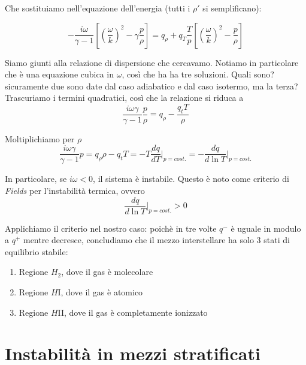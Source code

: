 \documentclass{report}
\begin{document}
Che sostituiamo nell'equazione dell'energia (tutti i $\rho'$ si semplificano): 
\begin{tcolorbox}[colback=myg!15, colframe=black, boxrule=1pt]
\begin{equation}
   -\frac{i\omega}{\gamma -1}\left[\left(\frac{\omega}{k}\right)^2 - \gamma \frac{p}{\rho}\right] = q_\rho + q_T \frac{T}{p}\left[\left(\frac{\omega}{k} \right)^2 - \frac{p}{\rho}\right]
\end{equation}
\end{tcolorbox}

Siamo giunti alla relazione di dispersione che cercavamo. Notiamo in particolare che è una equazione cubica in $\omega$, così che ha ha tre soluzioni. Quali sono? sicuramente due sono date dal caso adiabatico e dal caso isotermo, ma la terza? \\

Trascuriamo i termini quadratici, così che la relazione si riduca a 
\begin{equation}
    \frac{i\omega \gamma}{\gamma -1} \frac{p}{\rho} = q_\rho - \frac{q_tT}{\rho}
\end{equation}

Moltiplichiamo per $\rho$
\begin{equation}
    \frac{i\omega \gamma}{\gamma -1} p = q_\rho\rho - q_tT = -T \frac{dq}{dT} \biggr|_{p=cost.}= -\frac{dq}{d\ln T}\biggr|_{p=cost.}
\end{equation}

In particolare, se $i\omega <0$, il sistema è instabile. Questo è noto come criterio di \emph{Fields} per l'instabilità termica, ovvero 
\begin{equation}
    \frac{dq}{d\ln T}\biggr|_{p=cost.} >0
\end{equation}


Applichiamo il criterio nel nostro caso: poichè in tre volte $q^-$ è uguale in modulo a $q^+$ mentre decresce, concludiamo che il mezzo interstellare ha solo 3 stati di equilibrio stabile: 
\begin{enumerate}
    \item Regione $H_2$, dove il gas è molecolare 
    \item Regione $H$I, dove il gas è atomico 
    \item Regione $H$II, dove il gas è completamente ionizzato
\end{enumerate}


\section{Instabilità in mezzi stratificati}
\end{document}
